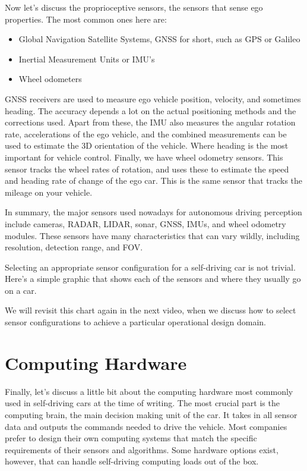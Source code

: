 Now let's discuss the proprioceptive sensors, the sensors that sense ego properties. The most common ones here
are:

\begin{itemize}
\item Global Navigation Satellite Systems, GNSS for short, such as GPS or Galileo
\item Inertial Measurement Units or IMU's
\item Wheel odometers
\end{itemize}

GNSS receivers are used to measure ego vehicle position, velocity, and sometimes heading. The accuracy depends a lot on
the actual positioning methods and the corrections used. Apart from these, the IMU also
measures the angular rotation rate, accelerations of the ego vehicle, and
the combined measurements can be used to estimate the 3D orientation
of the vehicle. Where heading is the most important for
vehicle control. Finally, we have wheel odometry sensors. This sensor tracks the wheel
rates of rotation, and uses these to estimate the speed and
heading rate of change of the ego car. This is the same sensor that tracks
the mileage on your vehicle. 



In summary, the major sensors used nowadays for autonomous driving perception
include cameras, RADAR, LIDAR, sonar, GNSS, IMUs,
and wheel odometry modules. These sensors have many
characteristics that can vary wildly, including resolution,
detection range, and FOV. 

Selecting an appropriate sensor configuration for a self-driving car is not trivial. Here's a simple graphic that
shows each of the sensors and where they usually go on a car. 


We will revisit this chart again in the
next video, when we discuss how to select sensor configurations to achieve
a particular operational design domain. 


\section{Computing Hardware}

Finally, let's discuss a little bit about the computing hardware most commonly used in  self-driving cars at the time of writing. The most crucial part
is the computing brain, the main decision making unit of the car. It takes in all sensor data and outputs
the commands needed to drive the vehicle. Most companies prefer to design their own
computing systems that match the specific requirements of their sensors and
algorithms. Some hardware options exist, however, that can handle self-driving
computing loads out of the box. 

